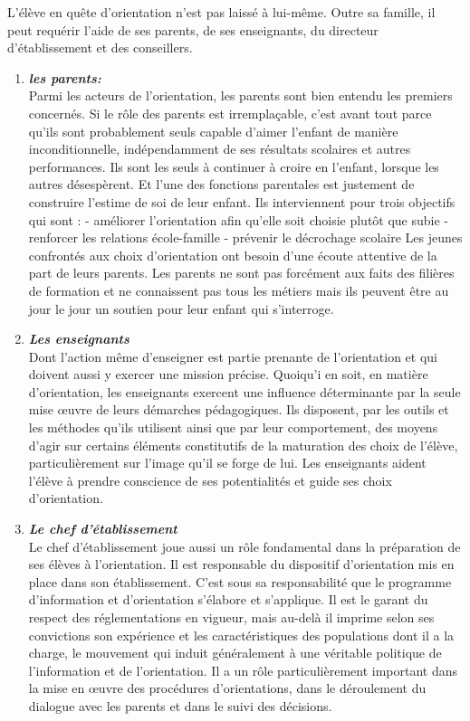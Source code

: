 L’élève en quête d’orientation n’est pas laissé à lui-même.  Outre sa famille, il peut requérir l’aide de ses parents, de ses enseignants, du directeur d’établissement et des conseillers.
\begin{enumerate}
	\item \textit{\textbf{les parents: }} \\
	Parmi les acteurs de l’orientation, les parents sont bien entendu les premiers concernés. Si le rôle des parents est irremplaçable, c’est  avant tout parce qu’ils sont probablement seuls capable d’aimer l’enfant de manière inconditionnelle, indépendamment de ses résultats scolaires et autres performances. Ils sont les seuls à continuer à croire en l’enfant, lorsque les autres désespèrent. Et l’une des fonctions parentales est justement de construire l’estime de soi de leur enfant.
Ils interviennent pour trois objectifs qui sont :	
-  améliorer l’orientation afin qu’elle soit choisie plutôt que subie
-  renforcer les relations école-famille 
-  prévenir le décrochage scolaire
Les jeunes confrontés aux choix d’orientation ont besoin  d’une écoute attentive de la part de leurs parents. Les parents  ne sont pas forcément aux faits des filières de formation et  ne connaissent pas tous les métiers mais ils peuvent être au  jour le jour un soutien pour leur enfant qui s’interroge.
		\item \textit{\textbf{Les enseignants}} \\
		Dont l’action même d’enseigner est partie prenante de l’orientation et qui doivent aussi y exercer une mission précise.
Quoiqu’i en soit, en matière d’orientation, les enseignants exercent une influence déterminante par la seule mise œuvre de leurs démarches pédagogiques. Ils disposent, par les outils et les méthodes qu’ils utilisent ainsi que par leur comportement, des moyens d’agir sur certains éléments constitutifs de la maturation des choix de l’élève, particulièrement sur l’image qu’il se forge de lui. Les enseignants aident l’élève à prendre conscience  de ses potentialités et guide ses choix d’orientation.  
	\item \textit{\textbf{Le chef d’établissement}} \\
	Le chef d’établissement joue aussi un rôle fondamental dans la préparation de ses élèves à l’orientation. Il est responsable du dispositif d’orientation mis en place dans son établissement. C’est sous sa responsabilité que le programme d’information et d’orientation s’élabore et s’applique. Il est le garant du respect des réglementations en vigueur, mais au-delà il imprime selon ses convictions son expérience et les caractéristiques des populations dont il a la charge, le mouvement qui induit généralement à une véritable politique de l’information et de l’orientation. Il a un rôle particulièrement important dans la mise en œuvre des procédures d’orientations, dans le déroulement du dialogue avec les parents et dans le suivi des décisions.

\end{enumerate}

